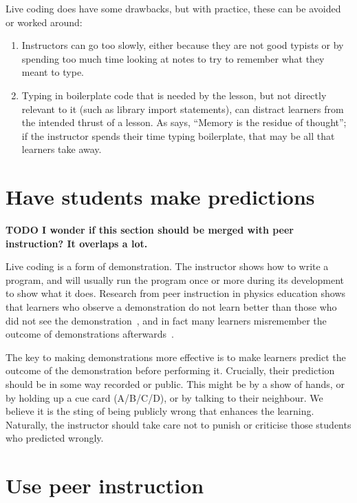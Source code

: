 \documentclass{article}
\begin{document}
Live coding does have some drawbacks, but with practice, these can be
avoided or worked around:

\begin{enumerate}
\item  Instructors can go too slowly, either because they are not good
    typists or by spending too much time looking at notes to try to
    remember what they meant to type.

\item  Typing in boilerplate code that is needed by the lesson, but not
    directly relevant to it (such as library import statements), can
    distract learners from the intended thrust of a lesson.  As
    \citet{willingham-book} says, ``Memory is the residue of thought'';
    if the instructor spends their time typing boilerplate, that may
    be all that learners take away.
\end{enumerate}

\section{Have students make predictions}

\textbf{TODO I wonder if this section should be merged with peer instruction?  It overlaps a lot.}

Live coding is a form of demonstration.  The instructor shows how to write a program, and will usually run the program once or more during its development to show what it does.  Research from peer instruction in physics education shows that learners who observe a demonstration do not learn better than those who did not see the demonstration~\citep{crouch-demo}, and in fact many learners misremember the outcome of demonstrations afterwards~\citep{miller-demo}.

The key to making demonstrations more effective is to make learners predict the outcome of the demonstration before performing it.  Crucially, their prediction should be in some way recorded or public.  This might be by a show of hands, or by holding up a cue card (A/B/C/D), or by talking to their neighbour.  We believe it is the sting of being publicly wrong that enhances the learning.  Naturally, the instructor should take care not to punish or criticise those students who predicted wrongly.

\section{Use peer instruction}
\end{document}
